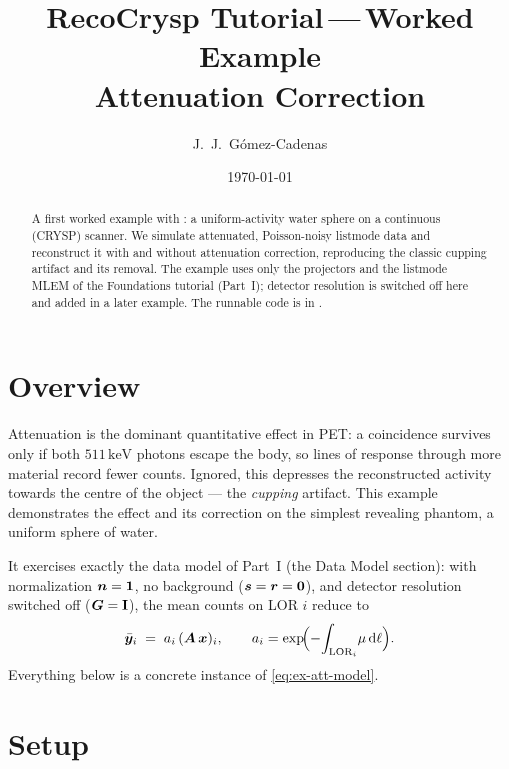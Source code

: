\documentclass[11pt,a4paper]{article}
\title{RecoCrysp Tutorial\,---\,Worked Example\\[2pt]
       \large Attenuation Correction}
\author{J.~J.~G\'omez-Cadenas}
\date{\today}
\begin{document}
\maketitle

\begin{abstract}
A first worked example with : a uniform-activity water sphere on
a continuous (CRYSP) scanner. We simulate attenuated, Poisson-noisy listmode
data and reconstruct it with and without attenuation correction, reproducing the
classic cupping artifact and its removal. The example uses only the projectors
and the listmode MLEM of the Foundations tutorial (Part~I); detector resolution
is switched off here and added in a later example. The runnable code is in
.
\end{abstract}

\section{Overview}
\label{sec:ex-att:overview}

Attenuation is the dominant quantitative effect in PET: a coincidence survives
only if both $511\,\mathrm{keV}$ photons escape the body, so lines of response
through more material record fewer counts. Ignored, this depresses the
reconstructed activity towards the centre of the object --- the \emph{cupping}
artifact. This example demonstrates the effect and its correction on the
simplest revealing phantom, a uniform sphere of water.

It exercises exactly the data model of Part~I (the Data Model section): with
normalization $\bm{n}=\bm1$, no background ($\bm{s}=\bm{r}=\bm0$), and detector
resolution switched off ($\bm{G}=\mathbf I$), the mean counts on LOR $i$ reduce to
\begin{equation}
  \bar{\bm{y}}_i \;=\; a_i\,(\bm{A}\,\bm{x})_i ,
  \qquad
  a_i = \exp\!\Bigl(-\!\int_{\mathrm{LOR}_i}\!\mu\,\mathrm{d}\ell\Bigr).
  \label{eq:ex-att-model}
\end{equation}
Everything below is a concrete instance of \eqref{eq:ex-att-model}.

\section{Setup}
\label{sec:ex-att:setup}
\end{document}
